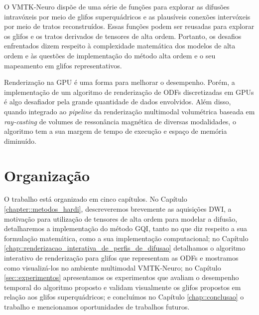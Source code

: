 \documentclass[
    12pt,                %
    oneside,            %
    a4paper,            %
    english,            %
    french,                %
    spanish,            %
    brazil                %
    ]{abntex2}
\begin{document}
O VMTK-Neuro dispõe de uma série de funções para explorar as difusões intravóxeis por meio de glifos superquádricos e as plausíveis conexões intervóxeis por meio de tratos reconstruídos. 
Essas funções podem ser reusadas para explorar os glifos e os tratos derivados de tensores de alta ordem. 
Portanto, os desafios enfrentados dizem respeito à complexidade matemática dos modelos de alta ordem e às questões de implementação do método alta ordem e o seu mapeamento em glifos representativos.


Renderização na GPU é uma forma para melhorar o desempenho. Porém, a implementação de um algoritmo de renderização de ODFs discretizadas em GPUs é algo desafiador pela grande quantidade de dados envolvidos. 
Além disso, quando integrado ao \textit{pipeline} da renderização multimodal volumétrica baseada em \textit{ray-casting} de volumes de ressonância magnética de diversas modalidades, o algoritmo tem a sua margem de tempo de execução e espaço de memória diminuído.


\section{Organização}
\label{sec:intro_organizacao}

O trabalho está organizado em cinco capítulos. No Capítulo \ref{chapter::metodos_hardi}, descreveremos brevemente as aquisições DWI, a motivação para utilização de tensores de alta ordem para modelar a difusão, detalharemos a implementação do método GQI, tanto no que diz respeito a sua formulação matemática, como a sua implementação computacional; no Capítulo \ref{chap::renderizacao_interativa_de_perfis_de_difusao} detalhamos o algoritmo interativo de renderização para glifos que representam as ODFs e mostramos como visualizá-los no ambiente multimodal VMTK-Neuro; no Capítulo \ref{sec::experimentos} apresentamos os experimentos que avaliam o desempenho temporal do algoritmo proposto e validam visualmente os glifos propostos em relação aos glifos superquádricos;
e concluímos no Capítulo \ref{chap::conclusao} o trabalho e mencionamos oportunidades de trabalhos futuros.
\end{document}
